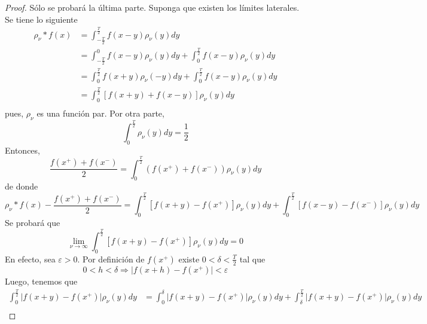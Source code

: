 \documentclass[12pt]{report}
\theoremstyle{largebreak}
\newcommand\abs[1]{\ensuremath{\big|#1\big|}}
\begin{document}
    \begin{proof}
        Sólo se probará la última parte. Suponga que existen los límites laterales. Se tiene lo siguiente
        \begin{equation*}
            \begin{split}
                \rho_\nu*f(x)&=\int_{-\frac{T}{2}}^{\frac{T}{2}}f(x-y)\rho_\nu(y)dy\\
                &=\int_{-\frac{T}{2}}^{0}f(x-y)\rho_\nu(y)dy+\int_{0}^{\frac{T}{2}}f(x-y)\rho_\nu(y)dy\\
                &=\int_{0}^{\frac{T}{2}}f(x+y)\rho_\nu(-y)dy+\int_{0}^{\frac{T}{2}}f(x-y)\rho_\nu(y)dy\\
                &=\int_{0}^{\frac{T}{2}}\left[f(x+y)+f(x-y) \right]\rho_\nu(y)dy\\
            \end{split}
        \end{equation*}
        pues, $\rho_\nu$ es una función par. Por otra parte, 
        \begin{equation*}
            \int_{0}^{\frac{T}{2}}\rho_\nu(y)dy=\frac{1}{2}
        \end{equation*}
        Entonces,
        \begin{equation*}
            \frac{f(x^+)+f(x^-)}{2}=\int_0^{\frac{T}{2}}(f(x^+)+f(x^-))\rho_\nu(y)dy
        \end{equation*}
        de donde
        \begin{equation*}
            \rho_\nu*f(x)-\frac{f(x^+)+f(x^-)}{2}=\int_0^{\frac{T}{2}}\left[f(x+y)-f(x^+)\right]\rho_\nu(y)dy+\int_0^{\frac{T}{2}}\left[f(x-y)-f(x^-)\right]\rho_\nu(y)dy
        \end{equation*}
        Se probará que
        \begin{equation*}
            \lim_{\nu\rightarrow\infty}\int_0^{\frac{T}{2}}\left[f(x+y)-f(x^+)\right]\rho_\nu(y)dy=0
        \end{equation*}
        En efecto, sea $\varepsilon>0$. Por definición de $f(x^+)$ existe $0<\delta<\frac{T}{2}$ tal que
        \begin{equation*}
            0<h<\delta\Rightarrow\abs{f(x+h)-f(x^+)}<\varepsilon
        \end{equation*}
        Luego, tenemos que
        \begin{equation*}
            \begin{split}
                \int_0^{\frac{T}{2}}\abs{f(x+y)-f(x^+)} \rho_\nu(y)dy&=\int_0^{\delta}\abs{f(x+y)-f(x^+)}\rho_\nu(y)dy+\int_{\delta}^{\frac{T}{2}}\abs{f(x+y)-f(x^+)}\rho_\nu(y)dy\\

\end{split}
\end{equation*}
\end{proof}
\end{document}
